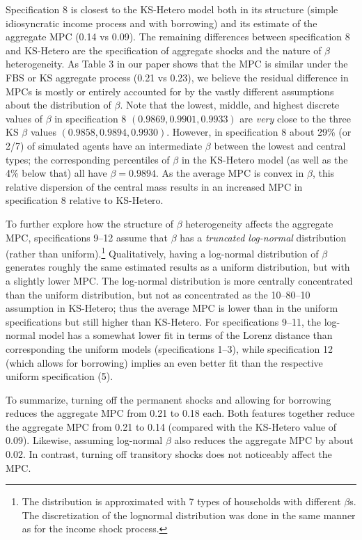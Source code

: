 \documentclass{econtex}\usepackage[pdftex]{graphicx}\usepackage{epstopdf} \usepackage[pdftex]{hyperref}
\begin{document}
Specification 8 is closest to the KS-Hetero model both in its structure (simple idiosyncratic income process and with borrowing) and its estimate of the aggregate MPC (0.14 vs 0.09).  The remaining differences between specification 8 and KS-Hetero are the specification of aggregate shocks and the nature of $\beta$ heterogeneity.  As Table 3 in our paper shows that the MPC is similar under the FBS or KS aggregate process (0.21 vs 0.23), we believe the residual difference in MPCs is mostly or entirely accounted for by the vastly different assumptions about the distribution of $\beta$.  Note that the lowest, middle, and highest discrete values of $\beta$ in specification 8 $(0.9869,0.9901,0.9933)$ are \textit{very} close to the three KS $\beta$ values $(0.9858,0.9894,0.9930)$.  However, in specification 8 about 29\% (or 2/7) of simulated agents have an intermediate $\beta$ between the lowest and central types; the corresponding percentiles of $\beta$ in the KS-Hetero model (as well as the 4\% below that) all have $\beta=0.9894$.  As the average MPC is convex in $\beta$, this relative dispersion of the central mass results in an increased MPC in specification 8 relative to KS-Hetero.

To further explore how the structure of $\beta$ heterogeneity affects the aggregate MPC, specifications 9--12 assume that $\beta$ has a \emph{truncated log-normal} distribution (rather than uniform).\footnote{The distribution is approximated with 7 types of households with different $\beta$s.  The discretization of the lognormal distribution was done in the same manner as for the income shock process.} Qualitatively, having a log-normal distribution of $\beta$ generates roughly the same estimated results as a uniform distribution, but with a slightly lower MPC.  The log-normal distribution is more centrally concentrated than the uniform distribution, but not as concentrated as the 10--80--10 assumption in KS-Hetero; thus the average MPC is lower than in the uniform specifications but still higher than KS-Hetero. For specifications 9--11, the log-normal model has a somewhat lower fit in terms of the Lorenz distance than corresponding the uniform models (specifications 1--3), while specification 12 (which allows for borrowing) implies an even better fit than the respective uniform specification (5).

To summarize, turning off the permanent shocks and allowing for borrowing reduces the aggregate MPC from 0.21 to 0.18 each. Both features together reduce the aggregate MPC from 0.21 to 0.14 (compared with the KS-Hetero value of 0.09). Likewise, assuming log-normal $\beta$ also reduces the aggregate MPC by about 0.02.  In contrast, turning off transitory shocks does not noticeably affect the MPC.




\nocite{SSLifeTables}

\small


\end{document}
